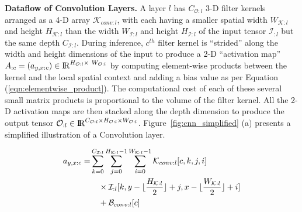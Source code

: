 \vspace{2mm}
\noindent \textbf{Dataflow of Convolution Layers.}
A layer $l$ has $C_{\mathcal{O}:l}$ 3-D filter kernels arranged as a 4-D array $\mathcal{K}_{conv:l}$, with each having a smaller spatial width $W_{\mathcal{K}:l}$ and height $H_{\mathcal{K}:l}$ than the width $W_{\mathcal{I}:l}$ and height $H_{\mathcal{I}:l}$ of the input tensor $\mathcal{I}_{:l}$ but the same depth $C_{\mathcal{I}:l}$. During inference, $c^{th}$ filter kernel is ``strided'' along the width and height dimensions of the input to produce a 2-D ``activation map'' $A_{:c}=(a_{y,x:c})\in \mathcal{\rm I\!R}^{H_{\mathcal{O}:l} \times~ W_{\mathcal{O}:l}}$ by computing element-wise products between the kernel and the local spatial context and adding a bias value as per Equation (\ref{eqn:elementwise_product}). The computational cost of each of these several small matrix products is proportional to the volume of the filter kernel. All the 2-D activation maps are then stacked along the depth dimension to produce the output tensor $\mathcal{O}_{:l} \in \mathcal{\rm I\!R}^{C_{\mathcal{O}:l} \times H_{\mathcal{O}:l} \times W_{\mathcal{O}:l}}$.
Figure~\ref{fig:cnn_simplified} (a) presents a simplified illustration of a Convolution layer.


\begin{align}
\label{eqn:elementwise_product}
\begin{split}
a_{y,x:c} =& \sum_{k=0}^{C_{\mathcal{I}:l} } \sum_{j=0}^{H_{\mathcal{K}:l}-1} \sum_{i=0}^{W_{\mathcal{K}:l}-1} \mathcal{K}_{conv:l}[c, k, j, i] \\
& \quad \times \mathcal{I}_{:l}[k,y-\lfloor\frac{H_{\mathcal{K}:l} }{2}\rfloor+j,x-\lfloor\frac{W_{\mathcal{K}:l} }{2}\rfloor+i] \\
& \quad + \mathcal{B}_{conv:l}[c]
\end{split}
\end{align}



